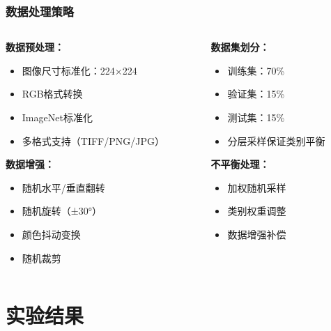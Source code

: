 \documentclass[12pt]{beamer}
\begin{document}
\begin{frame}
\frametitle{数据处理策略}
\begin{columns}
\begin{column}{0.5\textwidth}
\textbf{数据预处理：}
\begin{itemize}
    \item 图像尺寸标准化：224×224
    \item RGB格式转换
    \item ImageNet标准化
    \item 多格式支持（TIFF/PNG/JPG）
\end{itemize}

\vspace{0.3cm}
\textbf{数据增强：}
\begin{itemize}
    \item 随机水平/垂直翻转
    \item 随机旋转（±30°）
    \item 颜色抖动变换
    \item 随机裁剪
\end{itemize}
\end{column}

\begin{column}{0.5\textwidth}
\textbf{数据集划分：}
\begin{itemize}
    \item 训练集：70\%
    \item 验证集：15\%
    \item 测试集：15\%
    \item 分层采样保证类别平衡
\end{itemize}

\vspace{0.3cm}
\textbf{不平衡处理：}
\begin{itemize}
    \item 加权随机采样
    \item 类别权重调整
    \item 数据增强补偿
\end{itemize}
\end{column}
\end{columns}
\end{frame}

\section{实验结果}
\end{document}
